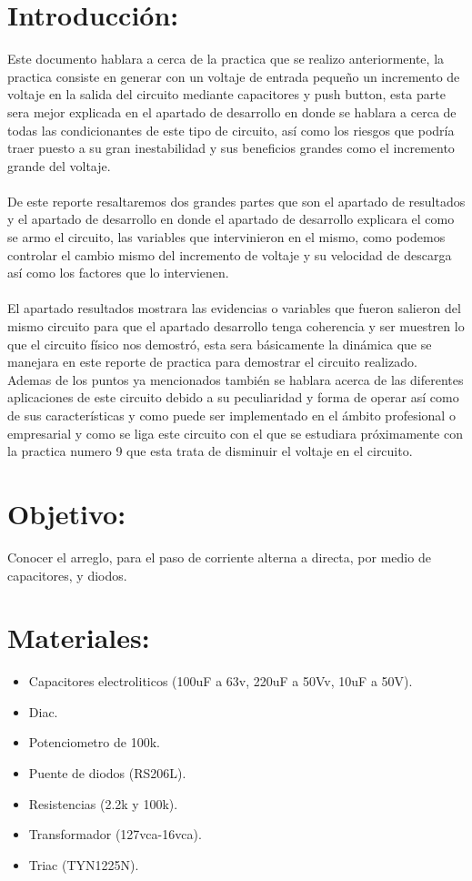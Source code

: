 \documentclass[12pt,a4paper]{article}
\begin{document}
\section{Introducción:}

Este documento hablara a cerca de la practica que se realizo anteriormente, la practica consiste en generar  con un voltaje de entrada pequeño un incremento de voltaje en la salida del circuito mediante capacitores y push button, esta parte sera mejor explicada en el apartado de desarrollo en donde se hablara a cerca de todas las condicionantes de este tipo de circuito, así como los riesgos que podría traer puesto a su gran inestabilidad y sus beneficios grandes como el incremento grande del voltaje.\\
\\De este reporte resaltaremos dos grandes partes que son el apartado de resultados y el apartado de desarrollo en donde el apartado de desarrollo explicara el como se armo el circuito, las variables que intervinieron en el mismo, como podemos controlar el cambio mismo del incremento de voltaje y su velocidad de descarga así como los factores que lo intervienen.\\
\\
El apartado resultados mostrara las evidencias o variables que fueron salieron del mismo circuito para que el apartado desarrollo tenga coherencia y ser muestren lo que el circuito físico nos demostró, esta sera básicamente la dinámica que se manejara en este reporte de practica para demostrar el circuito realizado. \\

Ademas de los puntos ya mencionados también se hablara acerca de las diferentes aplicaciones de este circuito debido a su peculiaridad y forma de operar así como de sus características y como puede ser implementado en el ámbito profesional o empresarial y como se liga este circuito con el que se estudiara próximamente con la practica numero 9 que esta trata  de disminuir el voltaje en el circuito.


\section{Objetivo:}
Conocer el arreglo, para el paso de corriente alterna a directa, por medio de capacitores, y diodos.\\ 

\section{Materiales:}
\begin{itemize}
\item Capacitores electroliticos (100uF a 63v, 220uF a 50Vv, 10uF a 50V).
\item Diac.
\item Potenciometro de 100k.
\item Puente de diodos (RS206L).
\item Resistencias (2.2k y 100k).
\item Transformador (127vca-16vca).
\item Triac (TYN1225N).
\end{itemize}
\newpage
\end{document}
